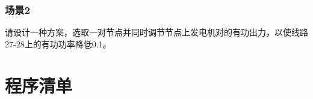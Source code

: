 \documentclass[a4paper,12pt]{article}
\begin{document}
    \subsubsection{场景2} 请设计一种方案，选取一对节点并同时调节节点上发电机对的有功出力，以使线路27-28上的有功功率降低0.1。

    
    
    \appendix
    \section{程序清单}
      
    \label{applastpage}
\iffalse
\begin{itemize}[noitemsep,topsep=0pt]
\end{itemize}
\begin{enumerate}[label=\Roman{*}.,noitemsep,topsep=0pt]
\end{enumerate}
\begin{multicols}{2}
\end{multicols}
\begin{lstlisting}[style=Matlab-editor,basicstyle=\mlttfamily]

\end{lstlisting}
\fi
\end{document}
